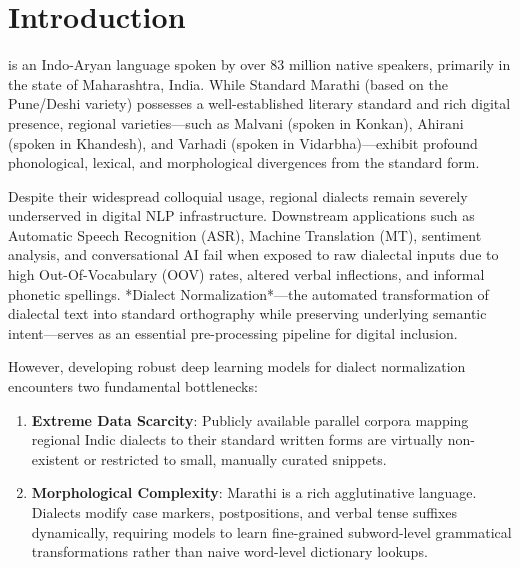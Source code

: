 \documentclass[journal,twocolumn]{IEEEtran}
\begin{document}
\section{Introduction}
 is an Indo-Aryan language spoken by over 83 million native speakers, primarily in the state of Maharashtra, India. While Standard Marathi (based on the Pune/Deshi variety) possesses a well-established literary standard and rich digital presence, regional varieties—such as Malvani (spoken in Konkan), Ahirani (spoken in Khandesh), and Varhadi (spoken in Vidarbha)—exhibit profound phonological, lexical, and morphological divergences from the standard form. 

Despite their widespread colloquial usage, regional dialects remain severely underserved in digital NLP infrastructure. Downstream applications such as Automatic Speech Recognition (ASR), Machine Translation (MT), sentiment analysis, and conversational AI fail when exposed to raw dialectal inputs due to high Out-Of-Vocabulary (OOV) rates, altered verbal inflections, and informal phonetic spellings. *Dialect Normalization*—the automated transformation of dialectal text into standard orthography while preserving underlying semantic intent—serves as an essential pre-processing pipeline for digital inclusion.

However, developing robust deep learning models for dialect normalization encounters two fundamental bottlenecks:
\begin{enumerate}
    \item \textbf{Extreme Data Scarcity}: Publicly available parallel corpora mapping regional Indic dialects to their standard written forms are virtually non-existent or restricted to small, manually curated snippets.
    \item \textbf{Morphological Complexity}: Marathi is a rich agglutinative language. Dialects modify case markers, postpositions, and verbal tense suffixes dynamically, requiring models to learn fine-grained subword-level grammatical transformations rather than naive word-level dictionary lookups.
\end{enumerate}
\end{document}
